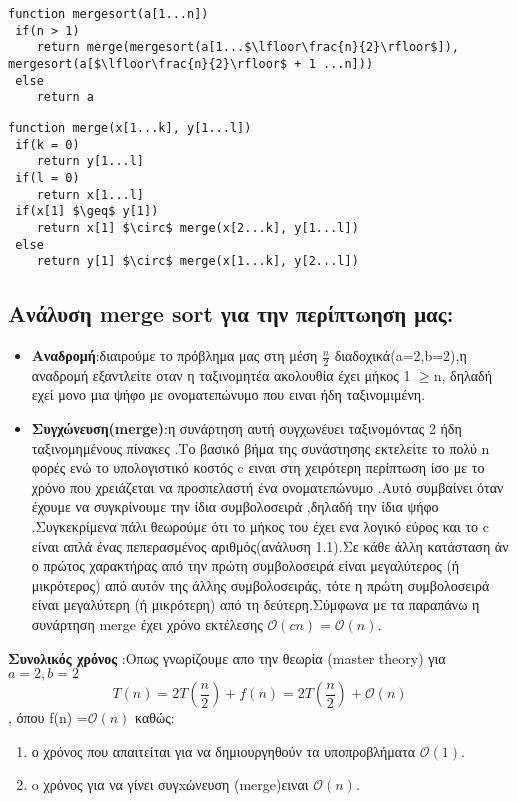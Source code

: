 \documentclass[a4paper]{article}
\begin{document}

\begin{tcolorbox}[colback=blue!20!white,colframe=purple!60!white,title=\textbf{Merge Sort}]
\begin{lstlisting}[mathescape]
function mergesort(a[1...n])
 if(n > 1)
 	return merge(mergesort(a[1...$\lfloor\frac{n}{2}\rfloor$]), mergesort(a[$\lfloor\frac{n}{2}\rfloor$ + 1 ...n]))
 else
 	return a
\end{lstlisting}
\lstset{
firstnumber=6
}
\begin{lstlisting}[mathescape]
function merge(x[1...k], y[1...l])
 if(k = 0)
 	return y[1...l]
 if(l = 0)
 	return x[1...l]
 if(x[1] $\geq$ y[1])
 	return x[1] $\circ$ merge(x[2...k], y[1...l])
 else
 	return y[1] $\circ$ merge(x[1...k], y[2...l])
\end{lstlisting}
\end{tcolorbox}

\subsection*{Ανάλυση merge sort για την περίπτωηση μας:}
\begin{itemize}
\item\textbf{Αναδρομή}:διαιρούμε το πρόβλημα μας στη μέση $\frac{n}{2}$ διαδοχικά(a=2,b=2),η αναδρομή εξαντλείτε  οταν η ταξινομητέα ακολουθία έχει μήκος 1 $\geq$n, δηλαδή εχεί μονο μια ψήφο με ονοματεπώνυμο που ειναι ήδη ταξινομιμένη.
\item \textbf{Συγχώνευση(merge)}:η συνάρτηση αυτή συγχωνέυει ταξινομόντας 2 ήδη ταξινομημένους πίνακες .Το βασικό βήμα της συνάστησης εκτελείτε το πολύ n φορές ενώ το υπολογιστικό κοστός c ειναι στη χειρότερη περίπτωση  ίσο με το χρόνο που χρειάζεται να προσπελαστή ένα ονοματεπώνυμο .Αυτό συμβαίνει όταν έχουμε να συγκρίνουμε την ίδια συμβολοσειρά ,δηλαδή την ίδια ψήφο .Συγκεκρίμενα  πάλι θεωρούμε ότι το μήκος του έχει ενα λογικό εύρος και το c είναι απλά ένας πεπερασμένος αριθμός(ανάλυση 1.1).Σε κάθε άλλη κατάσταση άν ο πρώτος χαρακτήρας από την πρώτη συμβολοσειρά είναι μεγαλύτερος (ή μικρότερος) από αυτόν της άλλης συμβολοσειράς, τότε η πρώτη συμβολοσειρά είναι μεγαλύτερη (ή μικρότερη) από τη δεύτερη.Σύμφωνα με τα παραπάνω η συνάρτηση merge έχει χρόνο εκτέλεσης \textbf{$\mathcal{O}(cn)=\mathcal{O}(n)$}.
    \end{itemize}
         \textbf{Συνολικός χρόνος} :Οπως  γνωρίζουμε απο την θεωρία (master theory) για $a=2,b=2$  $$Τ(n)=2T(\frac{n}{2})+f(n)=2T(\frac{n}{2})+\mathcal{O}(n)$$,
         όπου f(n) =$\mathcal{O}(n)$ καθώς:
         \begin{enumerate}
             \item ο χρόνος που απαιτείται για να δημιουργηθούν τα υποπροβλήματα $\mathcal{O}(1)$.
             \item o χρόνος για να γίνει συγxώνευση (merge)ειναι $\mathcal{O}(n)$.
         \end{enumerate}
         
\end{document}
